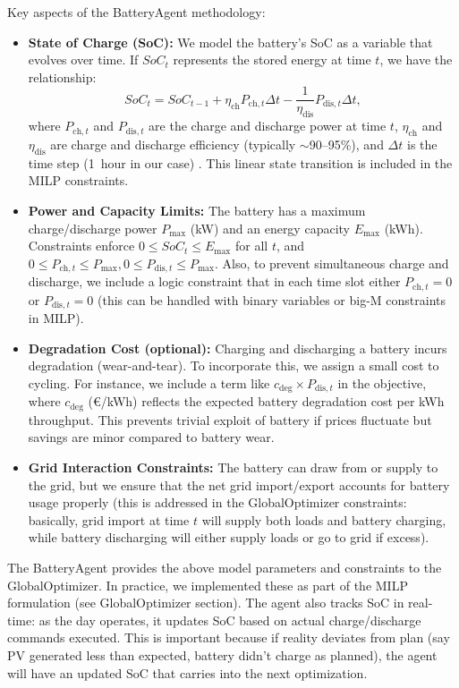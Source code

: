 \documentclass[12pt,a4paper]{article}
\begin{document}
Key aspects of the BatteryAgent methodology:
\begin{itemize}
    \item \textbf{State of Charge (SoC):} We model the battery’s SoC as a variable that evolves over time. If $SoC_t$ represents the stored energy at time $t$, we have the relationship:
    \[
    SoC_{t} = SoC_{t-1} + \eta_{\text{ch}} P_{\text{ch},t} \Delta t - \frac{1}{\eta_{\text{dis}}} P_{\text{dis},t} \Delta t,
    \] 
    where $P_{\text{ch},t}$ and $P_{\text{dis},t}$ are the charge and discharge power at time $t$, $\eta_{\text{ch}}$ and $\eta_{\text{dis}}$ are charge and discharge efficiency (typically $\sim$90–95\%), and $\Delta t$ is the time step (1~hour in our case) \cite{Rehman2025, TostadoVeliz2023}. This linear state transition is included in the MILP constraints.
    \item \textbf{Power and Capacity Limits:} The battery has a maximum charge/discharge power $P_{\max}$ (kW) and an energy capacity $E_{\max}$ (kWh). Constraints enforce $0 \le SoC_t \le E_{\max}$ for all $t$, and $0 \le P_{\text{ch},t} \le P_{\max}, 0 \le P_{\text{dis},t} \le P_{\max}$. Also, to prevent simultaneous charge and discharge, we include a logic constraint that in each time slot either $P_{\text{ch},t} = 0$ or $P_{\text{dis},t} = 0$ (this can be handled with binary variables or big-M constraints in MILP).
    \item \textbf{Degradation Cost (optional):} Charging and discharging a battery incurs degradation (wear-and-tear). To incorporate this, we assign a small cost to cycling. For instance, we include a term like $c_{\text{deg}} \times P_{\text{dis},t}$ in the objective, where $c_{\text{deg}}$ (€/kWh) reflects the expected battery degradation cost per kWh throughput. This prevents trivial exploit of battery if prices fluctuate but savings are minor compared to battery wear.
    \item \textbf{Grid Interaction Constraints:} The battery can draw from or supply to the grid, but we ensure that the net grid import/export accounts for battery usage properly (this is addressed in the GlobalOptimizer constraints: basically, grid import at time $t$ will supply both loads and battery charging, while battery discharging will either supply loads or go to grid if excess).
\end{itemize}

The BatteryAgent provides the above model parameters and constraints to the GlobalOptimizer. In practice, we implemented these as part of the MILP formulation (see GlobalOptimizer section). The agent also tracks SoC in real-time: as the day operates, it updates SoC based on actual charge/discharge commands executed. This is important because if reality deviates from plan (say PV generated less than expected, battery didn’t charge as planned), the agent will have an updated SoC that carries into the next optimization.
\end{document}
